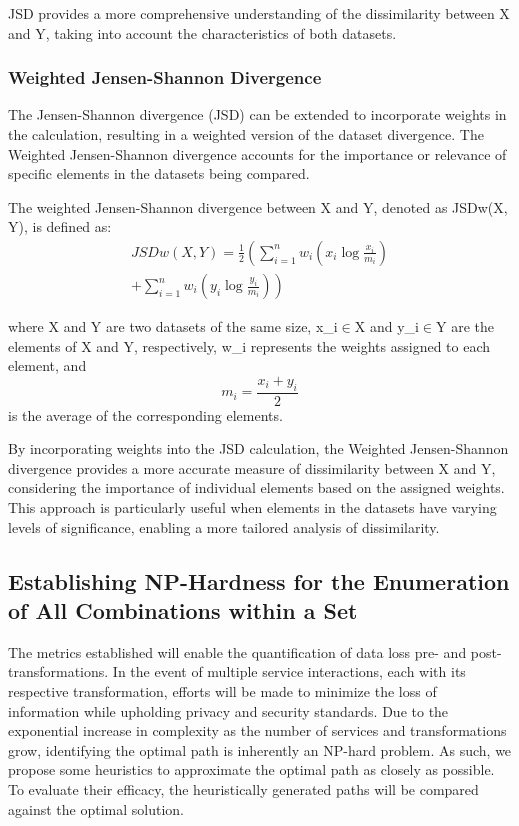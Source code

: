 JSD provides a more comprehensive understanding of the dissimilarity between X and Y, taking into account the characteristics of both datasets.

\subsubsection{Weighted Jensen-Shannon Divergence}

The Jensen-Shannon divergence (JSD) can be extended to incorporate weights in the calculation, resulting in a weighted version of the dataset divergence. The Weighted Jensen-Shannon divergence accounts for the importance or relevance of specific elements in the datasets being compared.

The weighted Jensen-Shannon divergence between X and Y, denoted as JSDw(X, Y), is defined as:
\begin{align*}
  JSDw(X, Y) = \frac{1}{2} \left( \sum_{i=1}^{n} w_i \left( x_i \log \frac{x_i}{m_i} \right) \right. \\
  \left. + \sum_{i=1}^{n} w_i \left( y_i \log \frac{y_i}{m_i} \right) \right)
\end{align*}

where X and Y are two datasets of the same size, x\_i$\in$X and y\_i$\in$Y are the elements of X and Y, respectively, w\_i represents the weights assigned to each element, and \[m_i = \frac{{x_i + y_i}}{2}\] is the average of the corresponding elements.

By incorporating weights into the JSD calculation, the Weighted Jensen-Shannon divergence provides a more accurate measure of dissimilarity between X and Y, considering the importance of individual elements based on the assigned weights. This approach is particularly useful when elements in the datasets have varying levels of significance, enabling a more tailored analysis of dissimilarity.

\subsection{Establishing NP-Hardness for the Enumeration of All Combinations within a Set}
The metrics established will enable the quantification of data loss pre- and post-transformations.
In the event of multiple service interactions, each with its respective transformation, efforts will be made to minimize the loss of information while upholding privacy and security standards.
Due to the exponential increase in complexity as the number of services and transformations grow, identifying the optimal path is inherently an NP-hard problem.
As such, we propose some heuristics to approximate the optimal path as closely as possible.
To evaluate their efficacy, the heuristically generated paths will be compared against the optimal solution.


